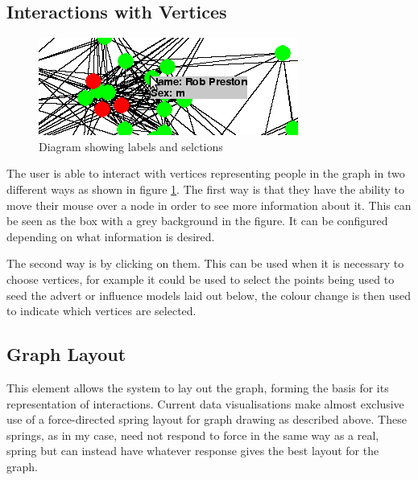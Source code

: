 \documentclass[12pt,a4paper]{article}
\begin{document}
\subsection{Interactions with Vertices}

\begin{figure}[htb]
\centering
\caption{Diagram showing labels and selctions}
\label{fig:labels}
\includegraphics[scale=0.7]{Select.png}
\end{figure}

\noindent
The user is able to interact with vertices representing people in the graph in two different ways as shown in figure \ref{fig:labels}. The first way is that they have the ability to move their mouse over a node in order to see more information about it. This can be seen as the box with a grey background in the figure. It can be configured depending on what information is desired.

The second way is by clicking on them. This can be used when it is necessary to choose vertices, for example it could be used to select the points being used to seed the advert or influence models laid out below, the colour change is then used to indicate which vertices are selected.

\subsection{Graph Layout}
\noindent
This element allows the system to lay out the graph, forming the basis for its representation of interactions. Current data visualisations make almost exclusive use of a force-directed spring layout for graph drawing as described above. These springs, as in my case, need not respond to force in the same way as a real, spring but can instead have whatever response gives the best layout for the graph.
\end{document}
